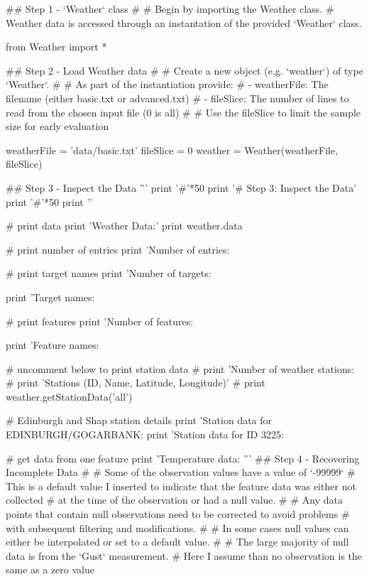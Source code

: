 \documentclass[12pt]{article}
\begin{document}
\begin{python}

## Step 1 - `Weather` class
#
# Begin by importing the Weather class.
# Weather data is accessed through an instantation of the provided `Weather` class.

from Weather import *

## Step 2 - Load Weather data
#
# Create a new object (e.g. `weather`) of type `Weather`.
#
# As part of the instantiation provide:
# - weatherFile: The filename (either basic.txt or advanced.txt)
# - fileSlice: The number of lines to read from the chosen input file (0 is all)
#
# Use the fileSlice to limit the sample size for early evaluation

weatherFile = 'data/basic.txt'
fileSlice = 0
weather = Weather(weatherFile, fileSlice)

## Step 3 - Inspect the Data
'''
print '#'*50
print '# Step 3: Inspect the Data'
print '#'*50
print '\n'

# print data
print 'Weather Data:'
print weather.data

# print number of entries
print 'Number of entries: %

# print target names
print 'Number of targets: %

print 'Target names: %

# print features
print 'Number of features: %

print 'Feature names: %

# uncomment below to print station data
# print 'Number of weather stations: %
# print 'Stations (ID, Name, Latitude, Longitude)'
# print weather.getStationData('all')

# Edinburgh and Shap station details
print 'Station data for EDINBURGH/GOGARBANK: %
print 'Station data for ID 3225: %

# get data from one feature
print 'Temperature data: %
'''
## Step 4 - Recovering Incomplete Data
#
# Some of the observation values have a value of `-99999`
# This is a default value I inserted to indicate that the feature data was either not collected
# at the time of the observation or had a null value.
#
# Any data points that contain null observations need to be corrected to avoid problems
# with subsequent filtering and modifications.
#
# In some cases null values can either be interpolated or set to a default value.
#
# The large majority of null data is from the `Gust` measurement.
# Here I assume than no observation is the same as a zero value


\end{python}
\end{document}
